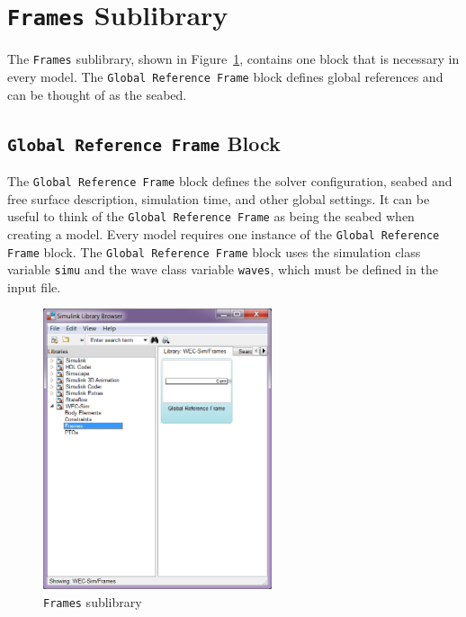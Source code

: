     \section{\texttt{Frames} Sublibrary}
    The \texttt{Frames} sublibrary, shown in Figure~\ref{fig:fLib}, contains one block 
    that is necessary in every model. The \texttt{Global Reference Frame} block defines global references 
    and can be thought of as the seabed.
    
        \subsection{\texttt{Global Reference Frame} Block}
		The \texttt{Global Reference Frame} block defines the solver 
		configuration, seabed 
		and free surface description, simulation time, and other global 
		settings. It can be useful to think of the \texttt{Global Reference Frame}
		as being the seabed when creating a model. 
		Every model requires one instance of the \texttt{Global 
		Reference Frame}
		block. The \texttt{Global Reference Frame} block uses the simulation 
		class variable \texttt{simu} and the wave class variable \texttt{waves},
		which must be defined in the input file.
		
		\begin{figure}[H]        
		\centering
		\includegraphics[width=0.6\textwidth]{libraryStructure/figures/framesLib}
		\caption{\texttt{Frames} sublibrary}
		\label{fig:fLib}
		\end{figure}	
    

